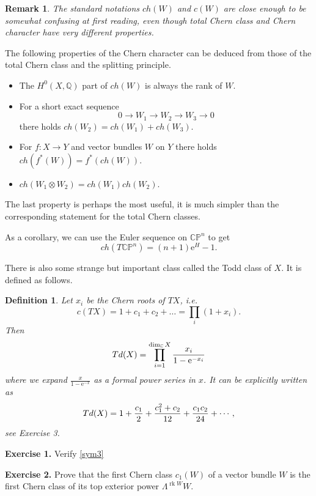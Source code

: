 \documentclass[11pt]{article}
\numberwithin{equation}{section}
\numberwithin{footnote}{section}
\newtheorem{defn}[thm]{Definition}
\newtheorem{rem}[thm]{Remark}
\newcommand{\blue}{\color{blue}}
\newcommand{\ee}{{\mathrm e}}
\renewcommand{\P}{{\mathbb P}}
\newcommand{\Q}{{\mathbb Q}}
\newcommand{\C}{{\mathbb C}}
\DeclareMathOperator{\rk}{rk}
\begin{document}
\smallskip
\begin{rem}
The standard notations $ch(W)$ and $c(W)$ are close enough to be somewhat confusing at first reading, even though total Chern class and Chern character have very different properties.
\end{rem}

The following properties of the Chern character can be deduced from those of the total Chern class and the splitting principle.
\begin{itemize}
\item The $H^0(X,\Q)$ part of $ch(W)$ is always the rank of $W$.

\item For a short exact sequence 
$$
0\to W_1 \to W_2 \to W_3 \to 0
$$
there holds $ch(W_2) = ch(W_1)+ch(W_3)$.

\item For $f:X\to Y$ and vector bundles $W$ on $Y$ there holds $ch(f^*(W))=f^*(ch(W))$.

\item $ch(W_1\otimes W_2)= ch(W_1)ch(W_2)$.

\end{itemize}

The last property is perhaps the most useful, it is much simpler than the corresponding statement for the total Chern classes.


\smallskip
As a corollary, we can use the Euler sequence on $\C\P^n$ to get
$$
ch(T\C\P^n) = (n+1)\ee^H -1.
$$

\smallskip
There is also some strange but important class called the {\blue Todd class} of $X$. It is defined as follows.

\smallskip
\begin{defn}
Let $x_i$ be the Chern roots of $TX$, i.e. 
$$c(TX)=1+ c_1 +c_2 + \ldots =\prod_i(1+x_i).$$
Then 
$$
{\rm Td}(X) = \prod_{i=1}^{\dim_\C X} \frac {x_i}{1-\ee^{-x_i}}
$$
where we expand $\frac {x}{1-\ee^{-x}}$ as a formal power series in $x$. It can be explicitly written as
\begin{equation}\label{td}
{\rm Td}(X)= 1 + \frac {c_1}2 + \frac {c_1^2 + c_2} {12}+\frac {c_1c_2}{24}+\cdots,
\end{equation}
see Exercise 3.
\end{defn}


{\bf Exercise 1.} Verify \eqref{sym3}

{\bf Exercise 2.} Prove that the first Chern class $c_1(W)$ of a vector bundle $W$ is the first Chern class of its top exterior power $\Lambda^{\rk W} W$.
\end{document}
